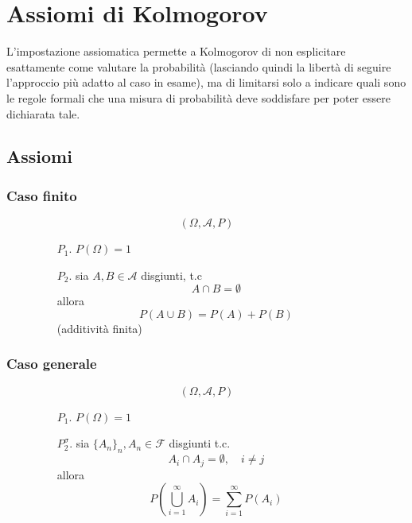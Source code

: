 \documentclass[a4paper]{article}
\theoremstyle{break}
\theoremstyle{break}
\theoremstyle{break}
\theoremstyle{break}
\begin{document}
\section{Assiomi di Kolmogorov}
L’impostazione assiomatica permette a Kolmogorov di non esplicitare esattamente come
valutare la probabilità (lasciando quindi la libertà di seguire l’approccio più adatto al caso in
esame), ma di limitarsi solo a indicare quali sono le regole formali che una misura di
probabilità deve soddisfare per poter essere dichiarata tale.

\subsection{Assiomi}
\subsubsection{Caso finito}
\begin{figure}[H]
  \begin{definition}
    \[
      (\Omega, \mathcal{A}, P)
    \] 
    \begin{enumerate}
      \item[$P_1.$] \( P(\Omega) = 1 \) 
      \item[$P_2.$] sia \( A,B \in \mathcal{A} \) disgiunti, t.c
        \[
          A \cap B = \emptyset 
        \] 
        allora
        \[
          P(A \cup B) = P(A) + P(B)
        \] 
        (additività finita)
    \end{enumerate}
  \end{definition}
\end{figure}

\subsubsection{Caso generale}
\begin{figure}[H]
  \begin{definition}
    \[
      (\Omega, \mathcal{A}, P)
    \] 
    \begin{enumerate}
      \item[$P_1.$] \( P(\Omega) = 1 \) 
      \item[$P_2^\sigma.$] sia \( \{A_n\}_n, A_n \in \mathcal{F}  \) disgiunti t.c.
        \[
          A_i \cap A_j = \emptyset, \quad i \neq j
        \] 
        allora
        \[
          P\left( \bigcup_{i=1}^{\infty} A_i \right) = \sum_{i=1}^{\infty} P(A_i)
        \] 
    \end{enumerate}
  \end{definition}
\end{figure}
\end{document}
